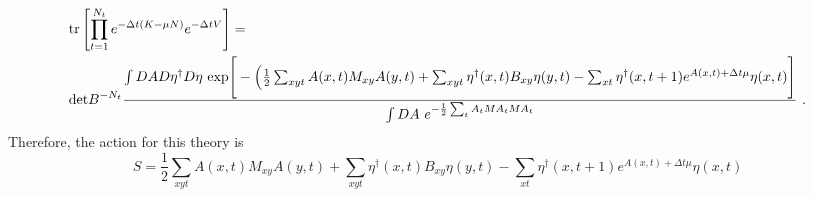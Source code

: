 \begin{align*}
& \text{tr}\left[\prod_{t=1}^{N_t} e^{-\Delta t(K - \mu N)}  e^{-\Delta t V}  \right] = \\
& {\text{det} B}^{-N_t} \frac{  
\int DA D\eta^{\dagger} D \eta ~ \text{exp}\Bigg[-\Big( \frac{1}{2} \sum_{x y t} A(x,t) M_{xy} A(y,t) + \sum_{x y t}\eta^{\dagger}(x,t) B_{x y} \eta(y,t) - \sum_{x t}\eta^{\dagger}(x,t+1) e^{A(x,t) + \Delta t \mu} \eta(x,t) \Bigg] 
}{ 
\int DA ~ e^{-\frac{1}{2} \sum_t {A}_t M {A}_t M A_t}  
}~.
\end{align*}
Therefore, the action for this theory is 
\begin{equation}
S =  \frac{1}{2} \sum_{x y t} A(x,t) M_{xy} A(y,t) + \sum_{x y t}\eta^{\dagger}(x,t) B_{x y} \eta(y,t) - \sum_{x t}\eta^{\dagger}(x,t+1) e^{A(x,t) + \Delta t \mu} \eta(x,t)
\end{equation}



